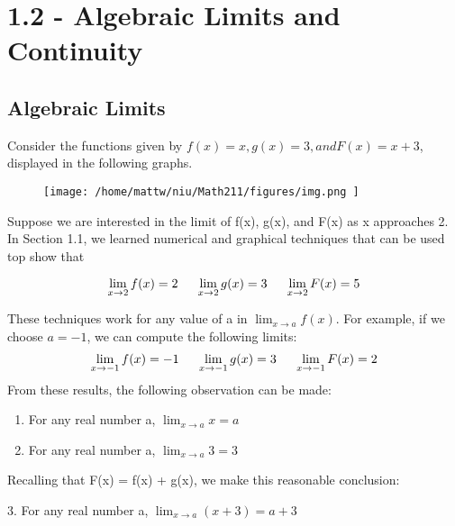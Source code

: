 \documentclass{report}
\begin{document}
\section*{1.2 - Algebraic Limits and Continuity}
\bigbreak \noindent \bigbreak \noindent
\subsection*{Algebraic Limits}
\bigbreak \noindent
Consider the functions given by $f(x) = x, g(x) = 3, and F(x) = x+3$, displayed in the following graphs.
\vspace{3mm}

\begin{figure}[ht]
\centering
\texttt{[image:  /home/mattw/niu/Math211/figures/img.png ]}
\end{figure}
\bigbreak \noindent
Suppose we are interested in the limit of f(x), g(x), and F(x) as x approaches 2. In Section 1.1, we learned numerical and graphical techniques that can be used top show that

$$\displaystyle\lim_{x\to 2}f(x)=2 \hspace{5mm} \displaystyle\lim_{x\to 2}g(x)=3 \hspace{5mm} \displaystyle\lim_{x\to 2}F(x)=5$$
\vspace{3mm}

\noindent These techniques work for any value of a in $\displaystyle\lim_{x\to a}f(x)$. For example, if we choose $a=-1$, we can compute the following limits:
$$\displaystyle\lim_{x\to -1}f(x)=-1 \hspace{5mm} \displaystyle\lim_{x\to -1}g(x)=3 \hspace{5mm} \displaystyle\lim_{x\to -1}F(x)=2$$
\bigbreak \noindent
From these results, the following observation can be made:
\begin{enumerate}
  \item For any real number a, $\displaystyle\lim_{x\to a }x=a$ 
  \item For any real number a, $\displaystyle\lim_{x\to a }3= 3$
\end{enumerate}
\bigbreak \noindent
Recalling that F(x) = f(x) + g(x), we make this reasonable conclusion:
\vspace{3mm}

\hspace{-6mm}3. For any real number a, $\displaystyle\lim_{x\to a }(x+3) = a + 3$
\bigbreak \noindent
\pagebreak
\end{document}
